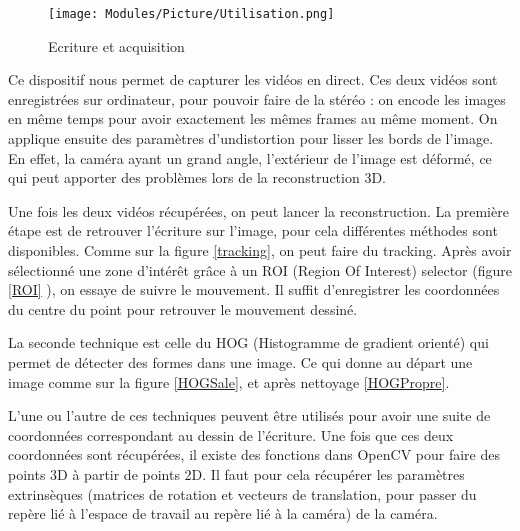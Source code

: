 
\begin{figure}[!h]
\centering
\texttt{[image: Modules/Picture/Utilisation.png]}
\caption{Ecriture et acquisition}
\label{utilisation}
\end{figure}

Ce dispositif nous permet de capturer les vidéos en direct. Ces deux vidéos sont enregistrées sur ordinateur, pour pouvoir faire de la stéréo : on encode les images en même temps pour avoir exactement les mêmes frames au même moment. On applique ensuite des paramètres d'undistortion pour lisser les bords de l'image. En effet, la caméra ayant un grand angle, l'extérieur de l'image est déformé, ce qui peut apporter des problèmes lors de la reconstruction 3D.

Une fois les deux vidéos récupérées, on peut lancer la reconstruction. La première étape est de retrouver l'écriture sur l'image, pour cela différentes méthodes sont disponibles. Comme sur la figure \ref{tracking}, on peut faire du tracking. Après avoir sélectionné une zone d'intérêt grâce à un ROI (Region Of Interest) selector (figure \ref{ROI} ), on essaye de suivre le mouvement. Il suffit d'enregistrer les coordonnées du centre du point pour retrouver le mouvement dessiné.

La seconde technique est celle du HOG (Histogramme de gradient orienté) qui permet de détecter des formes dans une image. Ce qui donne au départ une image comme sur la figure \ref{HOGSale}, et après nettoyage \ref{HOGPropre}.

L'une ou l'autre de ces techniques peuvent être utilisés pour avoir une suite de coordonnées correspondant au dessin de l'écriture. Une fois que ces deux coordonnées sont récupérées, il existe des fonctions dans OpenCV pour faire des points 3D à partir de points 2D. Il faut pour cela récupérer les paramètres extrinsèques (matrices de rotation et vecteurs de translation, pour passer du repère lié à l'espace de travail au repère lié à la caméra) de la caméra.



